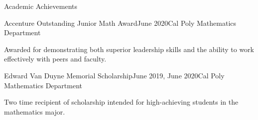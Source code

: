 \documentclass{resume} %
\begin{document}
\newpage

\begin{rSection}{Academic Achievements} 

\begin{rSubsection}{Accenture Outstanding Junior Math Award}{June 2020}{Cal Poly Mathematics Department}{}
\item Awarded for demonstrating both superior leadership skills and the ability to work effectively with peers and faculty.
\end{rSubsection}

\begin{rSubsection}{Edward Van Duyne Memorial Scholarship}{June 2019, June 2020}{Cal Poly Mathematics Department}{}
\item Two time recipient of scholarship intended for high-achieving students in the mathematics major.
\end{rSubsection}

\end{rSection}




\end{document}
